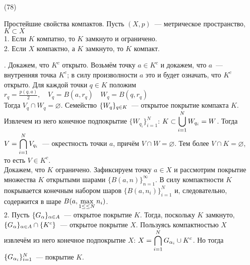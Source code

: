 (78)

\T \q Простейшие свойства компактов. Пусть $(X, p)$~--- метрическое пространство, $K \subset X$\\
1. Если $K$ компатно, то $K$ замкнуто и ограничено.\\
2. Если $X$ компактно, а $K$ замкнуто, то $K$ компакт.

. Докажем, что $K^c$ открыто. Возьмём точку $a\in K^c$ и докажем, что $a$~--- внутренняя точка $K^c$; в силу произволности $a$ это и будет означать, что $K^c$ открыто. Для каждой точки $q \in K$ положим\\
$r_q = \frac{p(q, a)}{2},\quad V_q = B(a, r_q)\quad W_q = B(q, r_q)$\\
Тогда $V_q \cap W_q = \varnothing$. Семейство $\iseq WqK$~--- открытое покрытие компакта $K$. Извлечем из него конечное подпокрытие $\{W_{q_i}\}^N_{i = 1}$: $K \subset \dsl \bigcup{i=1}N W_{q_i} = W$. Тогда $V = \dsl \bigcap{i = 1}N V_{q_i}$~--- окрестность точки $a$, причём $V\cap W = \varnothing$. Тем более $V \cap K = \varnothing$, то есть $V \in K^c$.\\
Докажем, что $K$ ограничено. Зафиксируем точку $a \in X$ и рассмотрим покрытие множества $K$ открытыми шарами $\{B(a, n)\}^\infty_{n = 1}$. В силу компактности $K$ покрывается конечным набором шаров $\{B(a, n_i)\}^N_{i = 1}$ и, следовательно, содержится в шаре $B(a, \dsl\max{1 \le \le N}{} n_i)$.\\
2. Пусть $\iseq G\alpha A$~--- открытое покрытие $K$. Тогда, поскольку $K$ замкнуто, $\iseq G\alpha A \cap \{K^c\}$~--- открытое покрытие $X$. Пользуясь компактностью $X$ извлечём из него конечное подпокрытие $X$: $X = \dsl\bigcap{i=1}N G_{\alpha_i}\cup K^c$. Но тогда $\se {G_{\alpha_i}}{i = 1}N$~--- покрытие $K$.